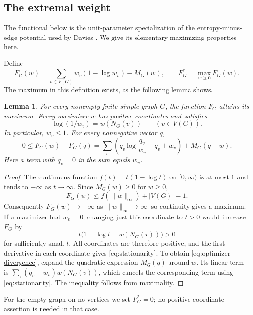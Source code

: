 \documentclass[11pt]{article}
\newtheorem{lemma}[theorem]{Lemma}
\theoremstyle{definition}
\theoremstyle{remark}
\numberwithin{equation}{section}
\begin{document}
\subsection{The extremal weight}

The functional below is the unit-parameter specialization of the
entropy-minus-edge potential used by Davies
\cite[Section~3.3, proof of Theorem~17]{Davies2026}.
We give its elementary maximizing properties here.

Define
\[
 F_G(w)=\sum_{v\in V(G)}w_v(1-\log w_v)-M_G(w),
 \qquad F_G^*=\max_{w\ge0}F_G(w).
\]
The maximum in this definition exists, as the following lemma shows.

\begin{lemma}\label{lem:optimizer}
For every nonempty finite simple graph $G$, the function $F_G$ attains its
maximum.  Every maximizer $w$ has positive coordinates and satisfies
\begin{equation}\label{eq:stationarity}
 \log(1/w_v)=w(N_G(v)) \qquad(v\in V(G)).
\end{equation}
In particular, $w_v\le1$.  For every nonnegative vector $q$,
\begin{equation}\label{eq:optimizer-divergence}
 0\le F_G(w)-F_G(q)
 =\sum_v\left(q_v\log\frac{q_v}{w_v}-q_v+w_v\right)
   +M_G(q-w).
\end{equation}
Here a term with $q_v=0$ in the sum equals $w_v$.
\end{lemma}

\begin{proof}
The continuous function $f(t)=t(1-\log t)$ on $[0,\infty)$ is at most $1$
and tends to $-\infty$ as $t\to\infty$.  Since $M_G(w)\ge0$ for $w\ge0$,
\[
 F_G(w)\le f(\|w\|_\infty)+|V(G)|-1.
\]
Consequently $F_G(w)\to-\infty$ as $\|w\|_\infty\to\infty$, so continuity
gives a maximum.  If a maximizer had $w_v=0$, changing just this coordinate
to $t>0$ would increase $F_G$ by
\[
 t\bigl(1-\log t-w(N_G(v))\bigr)>0
\]
for sufficiently small $t$.  All coordinates are therefore positive, and
the first derivative in each coordinate gives \eqref{eq:stationarity}.
To obtain \eqref{eq:optimizer-divergence}, expand the quadratic expression
$M_G(q)$ around $w$.  Its linear term is
$\sum_v(q_v-w_v)w(N_G(v))$, which cancels the corresponding term using
\eqref{eq:stationarity}.  The inequality follows from maximality.
\end{proof}

For the empty graph on no vertices we set $F_G^*=0$; no positive-coordinate
assertion is needed in that case.
\end{document}
